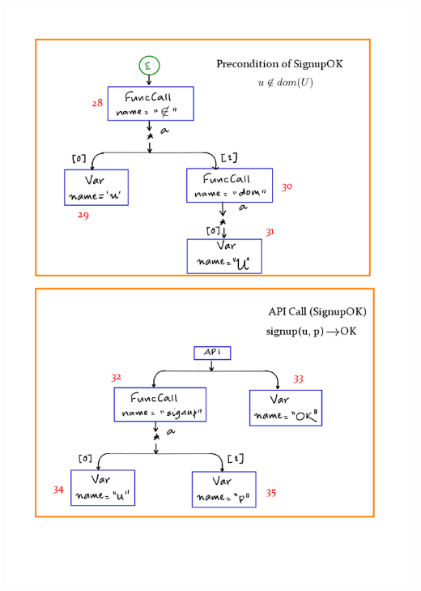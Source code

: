 \documentclass[12pts, a4paper]{article}
\begin{document}
\begin{center}
\includegraphics[width=\textwidth]{../images/spec-AST-5.png}


\end{center}
\end{document}
